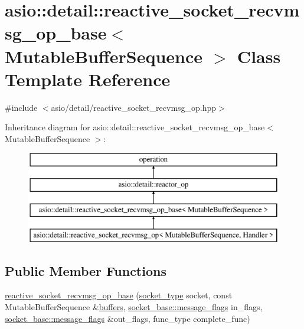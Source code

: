 \hypertarget{classasio_1_1detail_1_1reactive__socket__recvmsg__op__base}{}\section{asio\+:\+:detail\+:\+:reactive\+\_\+socket\+\_\+recvmsg\+\_\+op\+\_\+base$<$ Mutable\+Buffer\+Sequence $>$ Class Template Reference}
\label{classasio_1_1detail_1_1reactive__socket__recvmsg__op__base}


{\ttfamily \#include $<$asio/detail/reactive\+\_\+socket\+\_\+recvmsg\+\_\+op.\+hpp$>$}

Inheritance diagram for asio\+:\+:detail\+:\+:reactive\+\_\+socket\+\_\+recvmsg\+\_\+op\+\_\+base$<$ Mutable\+Buffer\+Sequence $>$\+:\begin{figure}[H]
\begin{center}
\leavevmode
\includegraphics[height=4.000000cm]{classasio_1_1detail_1_1reactive__socket__recvmsg__op__base}
\end{center}
\end{figure}
\subsection*{Public Member Functions}
\begin{DoxyCompactItemize}
\item 
\hyperlink{classasio_1_1detail_1_1reactive__socket__recvmsg__op__base_ae84e7e5ece471116f543eeaba78bc605}{reactive\+\_\+socket\+\_\+recvmsg\+\_\+op\+\_\+base} (\hyperlink{namespaceasio_1_1detail_a6798c771dd84b79798b1a08150706ea9}{socket\+\_\+type} socket, const Mutable\+Buffer\+Sequence \&\hyperlink{group__async__read_ga54dede45c3175148a77fe6635222c47d}{buffers}, \hyperlink{classasio_1_1socket__base_ac3cf77465dfedfe1979b5415cf32cc94}{socket\+\_\+base\+::message\+\_\+flags} in\+\_\+flags, \hyperlink{classasio_1_1socket__base_ac3cf77465dfedfe1979b5415cf32cc94}{socket\+\_\+base\+::message\+\_\+flags} \&out\+\_\+flags, func\+\_\+type complete\+\_\+func)
\end{DoxyCompactItemize}
